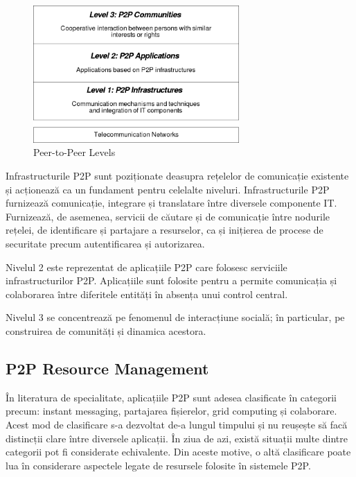 \begin{figure}
  \centering
  \includegraphics[width=0.7\textwidth]{src/img/p2p-systems/p2p-levels}
  \caption{Peer-to-Peer Levels}
  \label{fig:p2p-systems:p2p-levels}
\end{figure}

Infrastructurile P2P sunt poziționate deasupra rețelelor de comunicație
existente și acționează ca un fundament pentru celelalte niveluri.
Infrastructurile P2P furnizează comunicație, integrare și translatare între
diversele componente IT. Furnizează, de asemenea, servicii de căutare și de
comunicație între nodurile rețelei, de identificare și partajare a resurselor,
ca și inițierea de procese de securitate precum autentificarea și autorizarea.

Nivelul 2 este reprezentat de aplicațiile P2P care folosesc serviciile
infrastructurilor P2P. Aplicațiile sunt folosite pentru a permite comunicația
și colaborarea între diferitele entități în absența unui control central.

Nivelul 3 se concentrează pe fenomenul de interacțiune socială; în particular,
pe construirea de comunități și dinamica acestora.

\subsection{P2P Resource Management}

În literatura de specialitate, aplicațiile P2P sunt adesea clasificate în
categorii precum: instant messaging, partajarea fișierelor, grid computing și
colaborare. Acest mod de clasificare s-a dezvoltat de-a lungul timpului și nu
reușește să facă distincții clare între diversele aplicații. În ziua de azi,
există situații multe dintre categorii pot fi considerate echivalente. Din
aceste motive, o altă clasificare poate lua în considerare aspectele legate de
resursele folosite în sistemele P2P.

